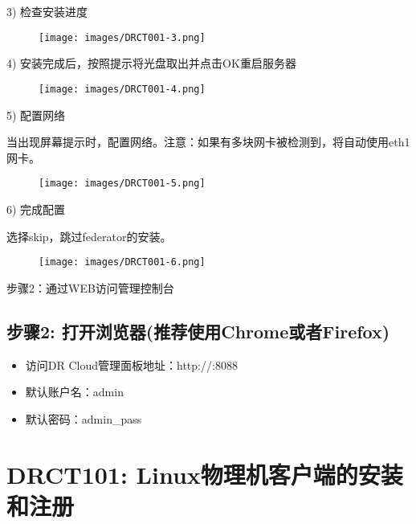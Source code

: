 3) 检查安装进度

\begin{figure}[htbp]
\centering
\texttt{[image: images/DRCT001-3.png]}
\end{figure}

4) 安装完成后，按照提示将光盘取出并点击OK重启服务器

\begin{figure}[htbp]
\centering
\texttt{[image: images/DRCT001-4.png]}
\end{figure}

5) 配置网络

当出现屏幕提示时，配置网络。注意：如果有多块网卡被检测到，将自动使用eth1网卡。

\begin{figure}[htbp]
\centering
\texttt{[image: images/DRCT001-5.png]}
\end{figure}

6) 完成配置

选择skip，跳过federator的安装。

\begin{figure}[htbp]
\centering
\texttt{[image: images/DRCT001-6.png]}
\end{figure}

步骤2：通过WEB访问管理控制台

\subsection{步骤2: 打开浏览器(推荐使用Chrome或者Firefox)}
\label{步骤2:打开浏览器推荐使用chrome或者firefox}

\begin{itemize}
\item 访问DR Cloud管理面板地址：http:\slash \slash :8088

\item 默认账户名：admin

\item 默认密码：admin\_pass

\end{itemize}

\section{DRCT101: Linux物理机客户端的安装和注册}
\label{drct101:linux物理机客户端的安装和注册}

